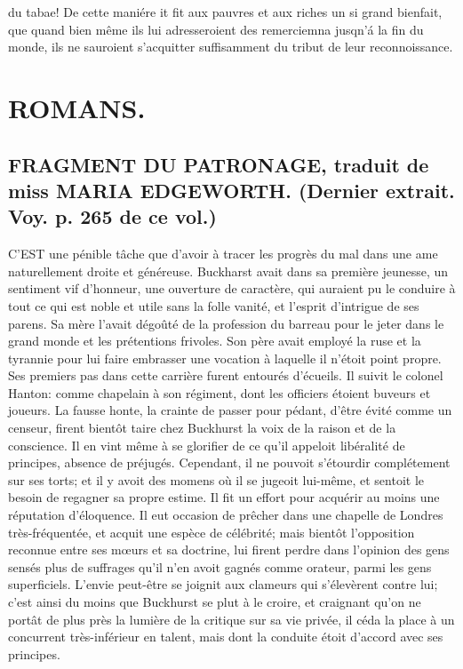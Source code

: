 du tabae! De cette maniére it fit aux pauvres et aux riches un si grand bienfait, que quand bien même ils lui adresseroient des remerciemna jusqn'á la fin du monde, ils ne sauroient s'acquitter suffisamment du tribut de leur reconnoissance.

\setcounter{page}{406}
\chapter{ROMANS.}
\section{FRAGMENT DU PATRONAGE, traduit de miss MARIA EDGEWORTH. \large{(Dernier extrait. Voy. p. 265 de ce vol.)}}
C'EST une pénible tâche que d'avoir à tracer les progrès du mal dans une ame naturellement droite et généreuse. Buckharst avait dans sa première jeunesse, un sentiment vif d'honneur, une ouverture de caractère, qui auraient pu le conduire à tout ce qui est noble et utile sans la folle vanité, et l'esprit d'intrigue de ses parens. Sa mère l'avait dégoûté de la profession du barreau pour le jeter dans le grand monde et les prétentions frivoles. Son père avait employé la ruse et la tyrannie pour lui faire embrasser une vocation à laquelle il n'étoit point propre. Ses premiers pas dans cette carrière furent entourés d'écueils. Il suivit le colonel Hanton:\setcounter{page}{407} comme chapelain à son régiment, dont les officiers étoient buveurs et joueurs. La fausse honte, la crainte de passer pour pédant, d'être évité comme un censeur, firent bientôt taire chez Buckhurst la voix de la raison et de la conscience. Il en vint même à se glorifier de ce qu'il appeloit libéralité de principes, absence de préjugés. Cependant, il ne
pouvoit s'étourdir complétement sur ses torts; et il y avoit des momens où il se jugeoit lui-même, et sentoit le besoin de regagner sa propre estime. Il fit un effort pour acquérir au moins une réputation d'éloquence. Il eut occasion de prêcher dans une chapelle de Londres très-fréquentée, et acquit une espèce de célébrité; mais bientôt l'opposition reconnue entre ses mœurs et sa doctrine, lui firent perdre dans l'opinion des gens sensés plus de suffrages qu'il n'en avoit gagnés comme orateur, parmi les gens superficiels. L'envie peut-être se joignit aux clameurs qui s'élevèrent contre lui; c'est ainsi du moins que Buckhurst se plut à le croire, et craignant qu'on ne portât de plus près la lumière de la critique sur sa vie privée, il céda la place à un concurrent très-inférieur
en talent, mais dont la conduite étoit d'accord avec ses principes.
